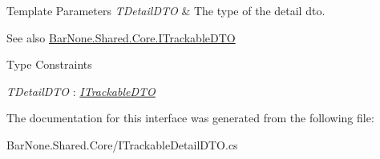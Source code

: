 \begin{DoxyTemplParams}{Template Parameters}
{\em T\+Detail\+D\+TO} & The type of the detail dto.\\
\hline
\end{DoxyTemplParams}
\begin{DoxySeeAlso}{See also}
\mbox{\hyperlink{interface_bar_none_1_1_shared_1_1_core_1_1_i_trackable_d_t_o}{Bar\+None.\+Shared.\+Core.\+I\+Trackable\+D\+TO}}


\end{DoxySeeAlso}
\begin{Desc}
\item[Type Constraints]\begin{description}
\item[{\em T\+Detail\+D\+TO} : {\em \mbox{\hyperlink{interface_bar_none_1_1_shared_1_1_core_1_1_i_trackable_d_t_o}{I\+Trackable\+D\+TO}}}]\end{description}
\end{Desc}


The documentation for this interface was generated from the following file\+:\begin{DoxyCompactItemize}
\item 
Bar\+None.\+Shared.\+Core/I\+Trackable\+Detail\+D\+T\+O.\+cs\end{DoxyCompactItemize}
